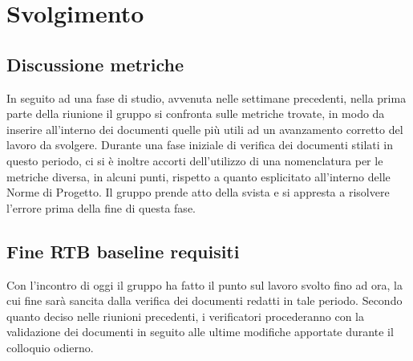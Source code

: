 \section{Svolgimento}
\subsection{Discussione metriche}
In seguito ad una fase di studio, avvenuta nelle settimane precedenti, nella prima parte della riunione il gruppo si confronta sulle metriche trovate, in modo da inserire all'interno dei \newline documenti quelle più utili ad un avanzamento corretto del lavoro da svolgere. 
Durante una fase iniziale di verifica dei documenti stilati in questo periodo, ci si è inoltre accorti dell'utilizzo di una nomenclatura per le metriche diversa, in alcuni punti, rispetto a quanto esplicitato all'interno delle Norme di Progetto. Il gruppo prende atto della svista e si appresta a risolvere l'errore prima della fine di questa fase.

\subsection{Fine RTB baseline requisiti}
Con l'incontro di oggi il gruppo ha fatto il punto sul lavoro svolto fino ad ora, la cui fine sarà sancita dalla verifica dei documenti redatti in tale periodo. Secondo quanto deciso nelle riunioni precedenti, i verificatori procederanno con la validazione dei documenti in seguito alle ultime modifiche apportate durante il colloquio odierno.

